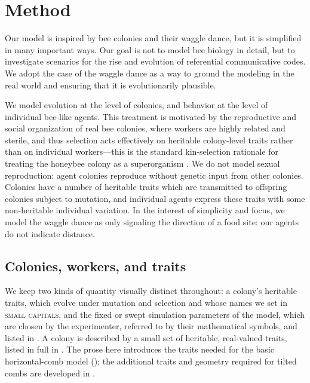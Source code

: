\documentclass[11pt]{article}
\newcommand{\trait}[1]{\textsc{#1}}
\begin{document}
\section{Method}
\label{sec:method}
Our model is inspired by bee colonies and their waggle dance, but it is
simplified in many important ways. Our goal is not to model bee biology in
detail, but to investigate scenarios for the rise and evolution of
referential communicative codes. We adopt the case of the waggle dance as a way
to ground the modeling in the real world and ensuring that it is evolutionarily
plausible.

We model evolution at the level of colonies, and behavior at the level of
individual bee-like agents. This treatment is motivated by the reproductive and social
organization of real bee colonies, where workers are highly related and
sterile, and thus selection acts effectively on heritable colony-level traits
rather than on individual workers---this is the standard kin-selection rationale
for treating the honeybee colony as a superorganism
\citep{hamilton1964genetical,seeley1989superorganism}. We do not model sexual
reproduction: agent colonies reproduce without genetic input from other colonies. 
Colonies have a number of heritable
traits which are transmitted to offspring colonies subject to mutation, and
individual agents express these traits with some non-heritable individual
variation. In the interest of simplicity and focus, we model the waggle dance as only signaling 
the direction of a food site: our agents do not indicate distance.

\subsection{Colonies, workers, and traits}
\label{sec:traits}
We keep two kinds of quantity visually distinct throughout: a colony's heritable
traits, which evolve under mutation and selection and whose names we set in
\trait{small capitals}, and the fixed or swept simulation parameters of the model,
which are chosen by the experimenter, referred to by their mathematical symbols,
and listed in . A colony is described
by a small set of heritable, real-valued traits, listed in full in
. The prose here introduces the traits needed for the basic
horizontal-comb model (); the additional traits and
geometry required for tilted combs are developed in .
\end{document}
